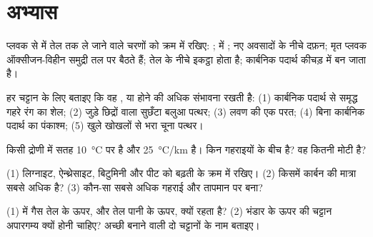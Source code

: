 \section{अभ्यास}

\begin{exercise}[$\star$]\label{exo:g11:fossil-fuel-geology:1}
प्लवक से  में तेल तक ले जाने वाले चरणों को क्रम में रखिए: ;
 में ; नए अवसादों के नीचे दफ़न; मृत प्लवक
ऑक्सीजन-विहीन समुद्री तल पर बैठते हैं; तेल  के नीचे इकट्ठा होता है; कार्बनिक
पदार्थ कीचड़ में  बन जाता है।
\end{exercise}

\begin{exercise}[$\star$]\label{exo:g11:fossil-fuel-geology:2}
हर चट्टान के लिए बताइए कि वह , 
या  होने की अधिक संभावना रखती है: (1) कार्बनिक पदार्थ से समृद्ध गहरे रंग का शेल; (2) जुड़े
छिद्रों वाला सुछँटा बलुआ पत्थर; (3) लवण की एक परत; (4) बिना कार्बनिक
पदार्थ का पंकाश्म; (5) खुले खोखलों से भरा चूना पत्थर।
\end{exercise}

\begin{exercise}[$\star$]\label{exo:g11:fossil-fuel-geology:3}
किसी द्रोणी में सतह \qty{10}{\degreeCelsius} पर है और  \qty{25}{\degreeCelsius/km} है।  किन गहराइयों के बीच
है? वह कितनी मोटी है?
\end{exercise}

\begin{exercise}[$\star$]\label{exo:g11:fossil-fuel-geology:4}
(1) लिग्नाइट, ऐन्थ्रेसाइट, बिटुमिनी  और पीट को बढ़ती  के क्रम में
रखिए। (2) किसमें कार्बन की मात्रा सबसे अधिक है? (3) कौन-सा सबसे
अधिक गहराई और तापमान पर बना?
\end{exercise}

\begin{exercise}[$\star$]\label{exo:g11:fossil-fuel-geology:5}
(1)  में गैस तेल के ऊपर, और तेल पानी के ऊपर, क्यों रहता है? (2) भंडार
के ऊपर की चट्टान अपारगम्य क्यों होनी चाहिए? अच्छी  बनाने वाली दो चट्टानों के नाम
बताइए।
\end{exercise}


